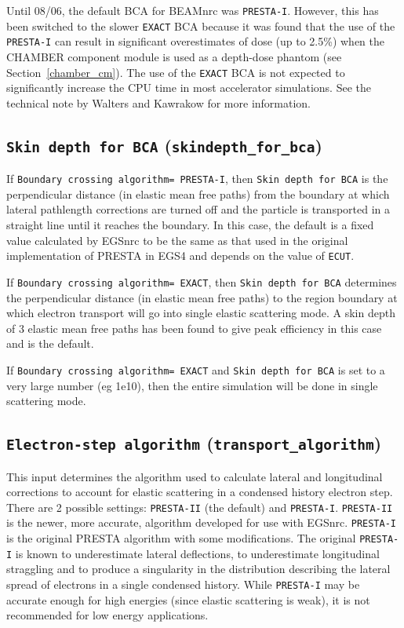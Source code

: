 \documentclass[12pt,twoside]{article}
\begin{document}
Until 08/06, the default BCA for BEAMnrc was
{\tt PRESTA-I}.  However, this has been switched to the slower
{\tt EXACT} BCA because
it was found that the use of the {\tt PRESTA-I} can result in
significant overestimates of dose (up to 2.5\%) when the CHAMBER component
module is used as a depth-dose phantom
(see Section~\ref{chamber_cm}).
The use of the {\tt EXACT} BCA is not expected to significantly increase
the CPU time in most accelerator simulations.  See the technical note
by Walters and Kawrakow\cite{WK06} for more information.


\subsection{{\tt  Skin depth for BCA} ({\tt skindepth\_for\_bca})}
\label{skindepthsect}
If {\tt Boundary crossing algorithm= PRESTA-I}, then
{\tt Skin depth for BCA} is the perpendicular distance
(in elastic mean free paths) from the boundary
at which lateral pathlength corrections are turned off and the particle
is transported in a straight line until it reaches the boundary.
In this case, the default is a fixed value calculated by EGSnrc to be
the same as that used in the original implementation of PRESTA in EGS4
and depends on the value of {\tt ECUT}.

If {\tt Boundary crossing algorithm= EXACT}, then {\tt  Skin depth for BCA}
determines the perpendicular distance (in elastic mean
free paths) to the region boundary
at which electron transport will go into
single elastic scattering mode.  A skin depth of 3 elastic mean free
paths has been found to give peak efficiency in this case and is the
default.

If {\tt Boundary crossing algorithm= EXACT} and
{\tt  Skin depth for BCA} is set to a very large number (eg 1e10),
then the entire simulation will be done in single scattering mode.

\subsection{{\tt Electron-step algorithm} ({\tt transport\_algorithm})}
\label{essect}

This input determines the algorithm used to calculate lateral and
longitudinal corrections to account for elastic scattering in a condensed
history electron step.  There are 2 possible settings: {\tt PRESTA-II}
(the default) and {\tt PRESTA-I}.  {\tt PRESTA-II}  is the newer,
more accurate, algorithm developed for use with EGSnrc\cite{KR03}.
{\tt PRESTA-I} is the original PRESTA algorithm with some
modifications\cite{BR87}.  The original {\tt PRESTA-I} is known
to underestimate lateral deflections, to underestimate longitudinal
straggling and to produce a singularity in the distribution describing
the lateral spread of electrons in a single condensed history.  While
{\tt PRESTA-I} may be accurate enough for high energies (since elastic
scattering is weak), it is not recommended for low energy applications.
\end{document}
